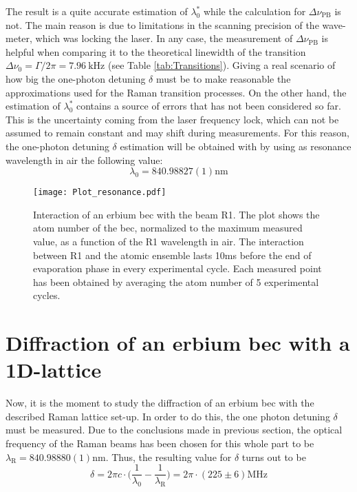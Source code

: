 The result is a quite accurate estimation of $\lambda_0^*$ while the calculation for $\Delta\nu_{\text{PB}}$ is not. The main reason is due to limitations in the scanning precision of the wave-meter, which was locking the laser. In any case, the measurement of $\Delta\nu_{\text{PB}}$ is helpful when comparing it to the theoretical linewidth of the transition $\Delta\nu_0 = \Gamma/2\pi = \SI{7.96}{\kilo\hertz}$ (see Table \ref{tab:Transitions}). Giving a real scenario of how big the one-photon detuning $\delta$ must be to make reasonable the approximations used for the Raman transition processes. On the other hand, the estimation of $\lambda_0^*$ contains a source of errors that has not been considered so far. This is the uncertainty coming from the laser frequency lock, which can not be assumed to remain constant and may shift during measurements. For this reason, the one-photon detuning $\delta$ estimation will be obtained with by using as resonance wavelength in air the following value:
\begin{equation*}
	\lambda_{0} = 840.98827(1)\si{\nano\meter}
\end{equation*}

\begin{figure}\centering
	\texttt{[image: Plot\_resonance.pdf]}
	\caption[Interaction of an erbium \ac{bec} with the beam R1]{Interaction of an erbium \ac{bec} with the beam R1. The plot shows the atom number of the \ac{bec}, normalized to the maximum measured value, as a function of the R1 wavelength in air. The interaction between R1 and the atomic ensemble lasts 10\si{\milli\second} before the end of evaporation phase in every experimental cycle. Each measured point has been obtained by averaging the atom number of 5 experimental cycles. }\label{fig:resonance_841_transition}
\end{figure}

\section{Diffraction of an erbium \ac{bec} with a 1D-lattice}

Now, it is the moment to study the diffraction of an erbium \ac{bec} with the described Raman lattice set-up. In order to do this, the one photon detuning $\delta$ must be measured. Due to the conclusions made in previous section, the optical frequency of the Raman beams has been chosen for this whole part to be $\lambda_\text{R} = 840.98880(1) \si{\nano\meter}$. Thus, the resulting value for $\delta$ turns out to be
\begin{equation*}
	\delta = 2\pi c\cdot\bigg(\frac{1}{\lambda_{0}} - \frac{1}{\lambda_\text{R}} \bigg) = 2\pi \cdot(225 \pm 6) \si{\mega\hertz}
\end{equation*}

